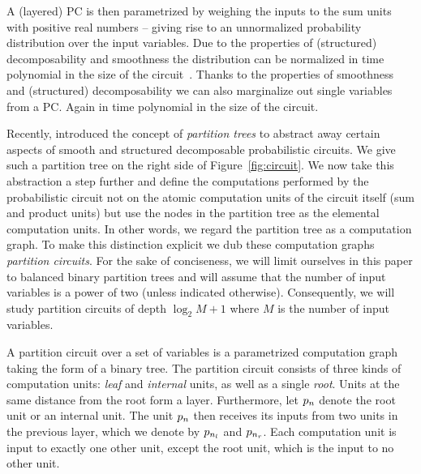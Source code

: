 A (layered) PC is then parametrized by weighing the inputs to the sum units with positive real numbers -- giving rise to an unnormalized probability distribution over the input variables. Due to the properties of (structured) decomposability and smoothness the distribution can be normalized in time polynomial in the size of the circuit~\citep{peharz2015theoretical}.
Thanks to the properties of smoothness and (structured) decomposability we can also marginalize out single variables from a PC. Again in time polynomial in the size of the circuit.









Recently, \citet{zuidberg2024probabilistic} introduced the concept of \textit{partition trees} to abstract away certain aspects of smooth and structured decomposable probabilistic circuits. We give such a partition tree on the right side of Figure~\ref{fig:circuit}. We now take this abstraction a step further and define the computations performed by the probabilistic circuit not on the atomic computation units of the circuit itself (\ie sum and product units) but use the nodes in the partition tree as the elemental computation units. In other words, we regard the partition tree as a computation graph. To make this distinction explicit we dub these computation graphs \textit{partition circuits}. For the sake of conciseness, we will limit ourselves in this paper to balanced binary partition trees and will assume that the number of input variables is a power of two (unless indicated otherwise). Consequently, we will study partition circuits of depth $\log_2 M+1$ where $M$ is the number of input variables.



\begin{definition}
	\label{def:partition_circuit}
	A partition circuit over a set of variables is a parametrized computation graph taking the form of a binary tree. The partition circuit consists of three kinds of computation units:
	\textit{leaf} and \textit{internal} units, as well as a single \textit{root}.
	Units at the same distance from the root form a layer.
	Furthermore, let $p_n$ denote the root unit or an internal unit. The unit $p_n$ then receives its inputs from two units in the previous layer, which we denote by $p_{n_l}$ and $p_{n_r}$. Each computation unit is input to exactly one other unit, except the root unit, which is the input to no other unit.
\end{definition}


